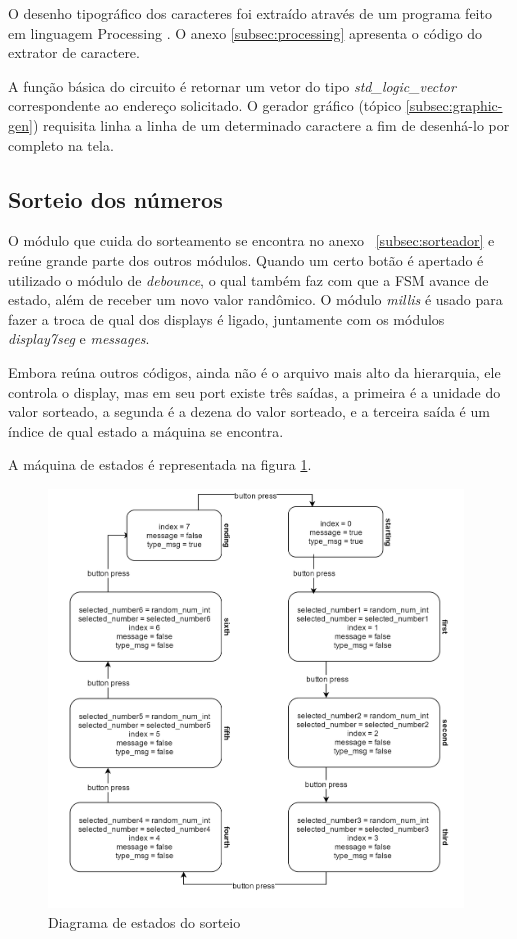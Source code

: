 \documentclass[12pt]{article}
\begin{document}
O desenho tipográfico dos caracteres foi extraído através de um programa feito em linguagem Processing \cite{p5}. O anexo \ref{subsec:processing} apresenta o código do extrator de caractere.

A função básica do circuito é retornar um vetor do tipo \emph{std\_logic\_vector} correspondente ao endereço solicitado. O gerador gráfico (tópico \ref{subsec:graphic-gen}) requisita linha a linha de um determinado caractere a fim de desenhá-lo por completo na tela.

\subsection{Sorteio dos números}
O módulo que cuida do sorteamento se encontra no anexo ~\ref{subsec:sorteador} e reúne grande parte dos outros módulos. Quando um certo botão é apertado é utilizado o módulo de \textit{debounce}, o qual também faz com que a FSM avance de estado, além de receber um novo valor randômico. O módulo \textit{millis} é usado para fazer a troca de qual dos displays é ligado, juntamente com os módulos \textit{display7seg} e \textit{messages}. 

Embora reúna outros códigos, ainda não é o arquivo mais alto da hierarquia, ele controla o display, mas em seu port existe três saídas, a primeira é a unidade do valor sorteado, a segunda é a dezena do valor sorteado, e a terceira saída é um índice de qual estado a máquina se encontra. 

A máquina de estados é representada na figura \ref{fig:fsmsort}.

\begin{figure}[!h]
    \centering
    \includegraphics[width=0.98\textwidth]{img/sorteador-fsm.png}
    \caption{Diagrama de estados do sorteio}
    \label{fig:fsmsort}
\end{figure}
\end{document}
